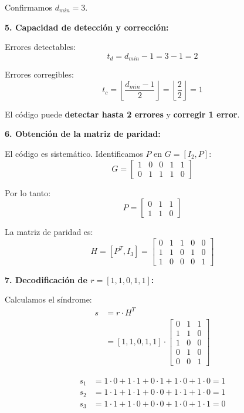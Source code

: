\documentclass[10pt,a4paper]{article}
\begin{document}
\begin{solucion}
Confirmamos $d_{min} = 3$.

\textbf{5. Capacidad de detección y corrección:}

Errores detectables:
\[
t_d = d_{min} - 1 = 3 - 1 = 2
\]

Errores corregibles:
\[
t_c = \left\lfloor \frac{d_{min} - 1}{2} \right\rfloor = \left\lfloor \frac{2}{2} \right\rfloor = 1
\]

El código puede \textbf{detectar hasta 2 errores} y \textbf{corregir 1 error}.

\textbf{6. Obtención de la matriz de paridad:}

El código es sistemático. Identificamos $P$ en $G = [I_2, P]$:
\[
G = \begin{bmatrix}
1 & 0 & \boxed{0} & \boxed{1} & \boxed{1} \\
0 & 1 & \boxed{1} & \boxed{1} & \boxed{0}
\end{bmatrix}
\]

Por lo tanto:
\[
P = \begin{bmatrix}
0 & 1 & 1 \\
1 & 1 & 0
\end{bmatrix}
\]

La matriz de paridad es:
\[
H = [P^T, I_3] = \begin{bmatrix}
0 & 1 & 1 & 0 & 0 \\
1 & 1 & 0 & 1 & 0 \\
1 & 0 & 0 & 0 & 1
\end{bmatrix}
\]

\textbf{7. Decodificación de $r = [1,1,0,1,1]$:}

Calculamos el síndrome:
\begin{align*}
s &= r \cdot H^T \\
&= [1,1,0,1,1] \cdot \begin{bmatrix}
0 & 1 & 1 \\
1 & 1 & 0 \\
1 & 0 & 0 \\
0 & 1 & 0 \\
0 & 0 & 1
\end{bmatrix}
\end{align*}

\begin{align*}
s_1 &= 1 \cdot 0 + 1 \cdot 1 + 0 \cdot 1 + 1 \cdot 0 + 1 \cdot 0 = 1 \\
s_2 &= 1 \cdot 1 + 1 \cdot 1 + 0 \cdot 0 + 1 \cdot 1 + 1 \cdot 0 = 1 \\
s_3 &= 1 \cdot 1 + 1 \cdot 0 + 0 \cdot 0 + 1 \cdot 0 + 1 \cdot 1 = 0
\end{align*}


\end{solucion}
\end{document}
